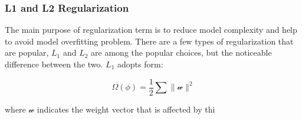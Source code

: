 \subsubsection{L1 and L2 Regularization}

The main purpose of regularization term is to reduce model complexity and help to avoid model overfitting problem. There are a few types of regularization that are popular, $L_1$ and $L_2$ are among the popular choices, but the noticeable difference between the two. $L_1$ adopts form:

\begin{equation}
   \Omega(\phi) = \frac {1}{2} \sum \parallel \mathcal{w} \parallel^2
\end{equation}

where $\mathcal{w}$ indicates the weight vector that is affected by thi